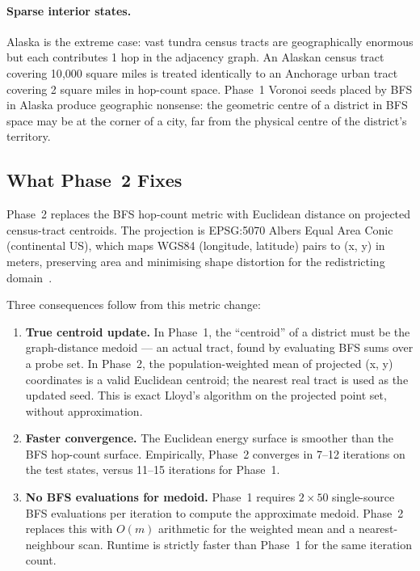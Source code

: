 \paragraph{Sparse interior states.}
Alaska is the extreme case: vast tundra census tracts are geographically
enormous but each contributes 1 hop in the adjacency graph.
An Alaskan census tract covering 10{,}000 square miles is treated identically
to an Anchorage urban tract covering 2 square miles in hop-count space.
Phase~1 Voronoi seeds placed by BFS in Alaska produce geographic nonsense:
the geometric centre of a district in BFS space may be at the corner of a
city, far from the physical centre of the district's territory.

\subsection{What Phase~2 Fixes}

Phase~2 \cvdgeo{} replaces the BFS hop-count metric with Euclidean distance
on projected census-tract centroids.
The projection is EPSG:5070 Albers Equal Area Conic (continental US), which
maps WGS84 (longitude, latitude) pairs to (x, y) in meters, preserving area
and minimising shape distortion for the redistricting domain~\citep{snyder1987,epsg5070}.

Three consequences follow from this metric change:

\begin{enumerate}
\item \textbf{True centroid update.}
  In Phase~1, the ``centroid'' of a district must be the graph-distance
  medoid --- an actual tract, found by evaluating BFS sums over a probe set.
  In Phase~2, the population-weighted mean of projected (x, y) coordinates
  is a valid Euclidean centroid; the nearest real tract is used as the
  updated seed.
  This is exact Lloyd's algorithm on the projected point set, without
  approximation.

\item \textbf{Faster convergence.}
  The Euclidean energy surface is smoother than the BFS hop-count surface.
  Empirically, Phase~2 converges in 7--12 iterations on the test states,
  versus 11--15 iterations for Phase~1.

\item \textbf{No BFS evaluations for medoid.}
  Phase~1 requires $2 \times 50$ single-source BFS evaluations per iteration
  to compute the approximate medoid.
  Phase~2 replaces this with $O(m)$ arithmetic for the weighted mean
  and a nearest-neighbour scan.
  Runtime is strictly faster than Phase~1 for the same iteration count.
\end{enumerate}


